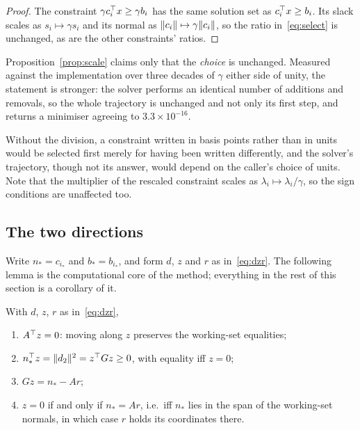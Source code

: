 \begin{proof}
The constraint $\gamma c_i^{\top} x \ge \gamma b_i$ has the same solution set as
$c_i^{\top} x \ge b_i$. Its slack scales as $s_i \mapsto \gamma s_i$ and its normal as
$\lVert c_i \rVert \mapsto \gamma\lVert c_i \rVert$, so the ratio in~\eqref{eq:select} is
unchanged, as are the other constraints' ratios.
\end{proof}

\begin{remark}
\label{rem:scaleexact}
Proposition~\ref{prop:scale} claims only that the \emph{choice} is unchanged.
Measured against the implementation over three decades of $\gamma$ either side of
unity, the statement is stronger: the solver performs an identical number of
additions and removals, so the whole trajectory is unchanged and not only its first
step, and returns a minimiser agreeing to $3.3\times10^{-16}$.
\end{remark}

Without the division, a constraint written in basis points rather than in units
would be selected first merely for having been written differently, and the
solver's trajectory, though not its answer, would depend on the caller's
choice of units. Note that the multiplier of the rescaled constraint scales as
$\lambda_i \mapsto \lambda_i/\gamma$, so the sign conditions are unaffected too.

\subsection{The two directions}

Write $n_* = c_{i_*}$ and $b_* = b_{i_*}$, and form $d$, $z$ and $r$
as in~\eqref{eq:dzr}. The following lemma is the computational core of the
method; everything in the rest of this section is a corollary of it.

\begin{lemma}\label{lem:directions}
With $d$, $z$, $r$ as in~\eqref{eq:dzr},
\begin{enumerate}
  \item[(i)] $A^{\top} z = 0$: moving along $z$ preserves the working-set equalities;
  \item[(ii)] $n_*^{\top} z = \lVert d_2 \rVert^2 = z^{\top} G z \ge 0$, with equality iff $z = 0$;
  \item[(iii)] $G z = n_* - A r$;
  \item[(iv)] $z = 0$ if and only if $n_* = A r$, i.e.\ iff $n_*$ lies in the span of
        the working-set normals, in which case $r$ holds its coordinates there.
\end{enumerate}
\end{lemma}

